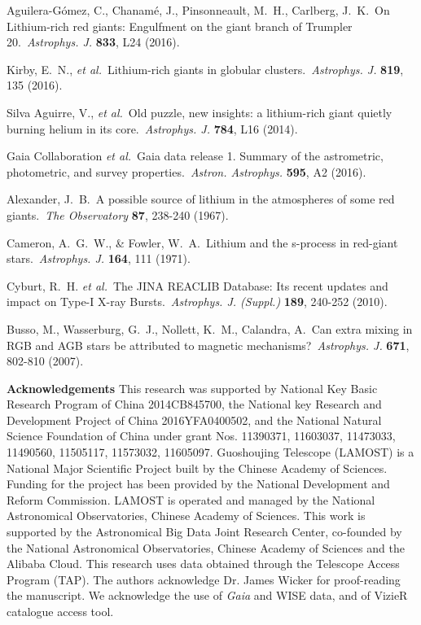 \documentclass[twoside,onecolumnm,12pt]{article}
\begin{document}
\begin{thebibliography}{99}
 Aguilera-G{\'o}mez, C., Chanam{\'e}, J., Pinsonneault, M.~H., Carlberg, J.~K.\ On Lithium-rich red giants: Engulfment on the giant branch of Trumpler 20.\ \emph{Astrophys. J.} \textbf{833}, L24 (2016). %

 Kirby, E.~N., \emph{et al.}\ Lithium-rich giants in globular clusters.\ \emph{Astrophys. J.} \textbf{819}, 135 (2016). %

 Silva Aguirre, V., \emph{et al.}\ Old puzzle, new insights: a lithium-rich giant quietly burning helium in its core.\ \emph{Astrophys. J.} \textbf{784}, L16 (2014). %

 Gaia Collaboration \emph{et al.}\ Gaia data release 1. Summary of the astrometric, photometric, and survey properties.\ \emph{Astron. Astrophys.} \textbf{595}, A2 (2016). %

 Alexander, J.~B.\ A possible source of lithium in the atmospheres of some red giants.\ \emph{The Observatory} \textbf{87}, 238-240 (1967). %

 Cameron, A.~G.~W., \& Fowler, W.~A.\ Lithium and the s-process in red-giant stars.\ \emph{Astrophys. J.} \textbf{164}, 111 (1971). %

 Cyburt, R.~H. \emph{et al.}\ The JINA REACLIB Database: Its recent updates and impact on Type-I X-ray Bursts.\ \emph{Astrophys. J. (Suppl.)} \textbf{189}, 240-252 (2010). %

 Busso, M., Wasserburg, G.~J., Nollett, K.~M., Calandra, A.\ Can extra mixing in RGB and AGB stars be attributed to magnetic mechanisms?\ \emph{Astrophys. J.} \textbf{671}, 802-810 (2007). %

\end{thebibliography}



\small

\noindent \textbf{Acknowledgements} {This research was supported by National Key Basic Research Program of China 2014CB845700, the National key Research and Development Project of China 2016YFA0400502, and the National Natural Science Foundation of China under grant Nos. 11390371, 11603037, 11473033, 11490560, 11505117, 11573032, 11605097. Guoshoujing Telescope (LAMOST) is a National Major Scientific Project built by the Chinese Academy of Sciences. Funding for the project has been provided by the National Development and Reform Commission. LAMOST is operated and managed by the National Astronomical Observatories, Chinese Academy of Sciences. This work is supported by the Astronomical Big Data Joint Research Center, co-founded by the National Astronomical Observatories, Chinese Academy of Sciences and the Alibaba Cloud. This research uses data obtained through the Telescope Access Program (TAP). The authors acknowledge Dr. James Wicker for proof-reading the manuscript. We acknowledge the use of {\it Gaia} and WISE data, and of VizieR catalogue access tool. 
}
\end{document}
